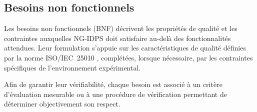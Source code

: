 \subsection{Besoins non fonctionnels}
\label{sec:bnf}

Les besoins non fonctionnels (BNF) décrivent les propriétés de qualité et les contraintes auxquelles NG-IDPS doit satisfaire au-delà des fonctionnalités attendues. Leur formulation s'appuie sur les caractéristiques de qualité définies par la norme ISO/IEC~25010 \cite{iso25010}, complétées, lorsque nécessaire, par les contraintes spécifiques de l'environnement expérimental.

Afin de garantir leur vérifiabilité, chaque besoin est associé à un critère d'évaluation mesurable ou à une procédure de vérification permettant de déterminer objectivement son respect.


